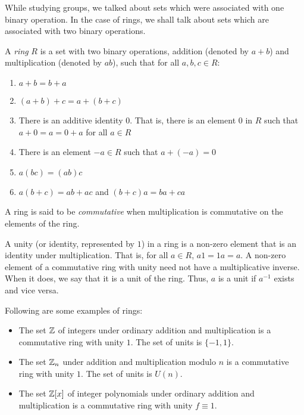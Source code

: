While studying groups, we talked about sets which were associated with one binary operation. In the case of rings, we shall talk about sets which are associated with two binary operations.

\begin{definition}[Ring]
	A \textit{ring} $R$ is a set with two binary operations, addition (denoted by $a+b$) and multiplication (denoted by $ab$), such that for all $a,b,c\in R$:
	\begin{enumerate}
		\item $a+b=b+a$
		\item $(a+b)+c = a+(b+c)$
		\item There is an additive identity $0$. That is, there is an element $0$ in $R$ such that $a+0=a=0+a$ for all $a\in R$
		\item There is an element $-a\in R$ such that $a+(-a)=0$
		\item $a(bc)=(ab)c$
		\item $a(b+c)=ab+ac$ and $(b+c)a=ba+ca$
	\end{enumerate}
\end{definition}

\begin{definition}
	A ring is said to be \textit{commutative} when multiplication is commutative on the elements of the ring.
\end{definition}

\begin{definition}[Unity]
	A unity (or identity, represented by $1$) in a ring is a non-zero element that is an identity under multiplication. That is, for all $a\in R$, $a1 = 1a = a$. A non-zero element of a commutative ring with unity need not have a multiplicative inverse. When it does, we say that it is a unit of the ring. Thus, $a$ is a unit if $a^{-1}$ exists and vice versa.
\end{definition}

Following are some examples of rings:
\begin{itemize}
	\item The set $\mathbb{Z}$ of integers under ordinary addition and multiplication is a commutative ring with unity $1$. The set of units is $\{-1,1\}$.
	\item The set $\mathbb{Z}_n$ under addition and multiplication modulo $n$ is a commutative ring with unity $1$. The set of units is $U(n)$.
	\item The set $\mathbb{Z}[x]$ of integer polynomials under ordinary addition and multiplication is a commutative ring with unity $f\equiv1$.
\end{itemize}


